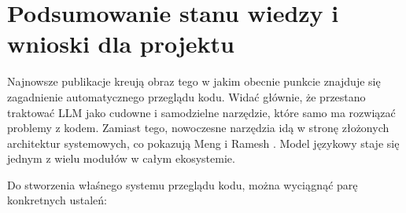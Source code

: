 \section{Podsumowanie stanu wiedzy i wnioski dla projektu}
\label{subsubsec:llm_acr_synthesis}

Najnowsze publikacje kreują obraz tego w jakim obecnie punkcie znajduje się zagadnienie automatycznego
przeglądu kodu. Widać głównie, że przestano traktować LLM jako cudowne i samodzielne narzędzie, które samo
ma rozwiązać problemy z kodem. Zamiast tego, nowoczesne narzędzia idą w stronę złożonych architektur systemowych, co pokazują 
Meng i Ramesh \cite{Meng2025RARe, Ramesh2025EricssonExperience}. Model językowy staje się jednym z wielu modułów w całym
ekosystemie.

Do stworzenia właśnego systemu przeglądu kodu, można wyciągnąć parę konkretnych ustaleń:
